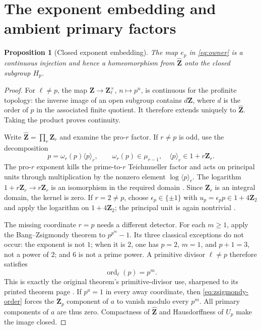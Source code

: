 \documentclass[11pt]{article}
\newtheorem{proposition}[theorem]{Proposition}
\theoremstyle{definition}
\DeclareMathOperator{\ord}{ord}
\begin{document}
\section{The exponent embedding and ambient primary factors}\label{sec:embedding}

\begin{proposition}[Closed exponent embedding]\label{prop:embedding}
The map $e_p$ in \eqref{eq:owner} is a continuous injection and hence a
homeomorphism from $\widehat{\mathbf Z}$ onto the closed subgroup $H_p$.
\end{proposition}

\begin{proof}
For $\ell\ne p$, the map $\mathbf Z\to\mathbf Z_\ell^\times$,
$n\mapsto p^n$, is continuous for the profinite topology: the inverse image
of an open subgroup contains $d\mathbf Z$, where $d$ is the order of $p$ in
the associated finite quotient.  It therefore extends uniquely to
$\widehat{\mathbf Z}$.  Taking the product proves continuity.

Write $\widehat{\mathbf Z}=\prod_r\mathbf Z_r$ and examine the pro-$r$
factor.  If $r\ne p$ is odd, use the decomposition
\[
p=\omega_r(p)\langle p\rangle_r,
\qquad
\omega_r(p)\in\mu_{r-1},
\quad \langle p\rangle_r\in1+r\mathbf Z_r.
\]
The pro-$r$ exponent kills the prime-to-$r$ Teichmueller factor and acts on
principal units through multiplication by the nonzero element
$\log\langle p\rangle_r$.  The logarithm
$1+r\mathbf Z_r\to r\mathbf Z_r$ is an isomorphism in the required domain
\citep[Example~8.15]{ConradInfiniteSeries}.  Since $\mathbf Z_r$ is an
integral domain, the kernel is zero.  If $r=2\ne p$, choose
$\epsilon_p\in\{\pm1\}$ with $u_p=\epsilon_pp\in1+4\mathbf Z_2$ and apply
the logarithm on $1+4\mathbf Z_2$; the principal unit is again nontrivial
\citep[Theorem~2.6 and Remark~2.8]{ConradPadicInterpolation}.

The missing coordinate $r=p$ needs a different detector.  For each $m\ge1$,
apply the Bang--Zsigmondy theorem to $p^{p^m}-1$.  Its three classical
exceptions do not occur: the exponent is not $1$; when it is $2$, one has
$p=2$, $m=1$, and $p+1=3$, not a power of $2$; and $6$ is not a prime
power.  A primitive divisor $\ell\ne p$ therefore satisfies
\begin{equation}\label{eq:zsigmondy-order}
\ord_\ell(p)=p^m.
\end{equation}
This is exactly the original theorem's primitive-divisor use, sharpened to
its printed theorem page
\citep[p.~283]{Zsigmondy1892}.  If $p^a=1$ in every away coordinate, then
\eqref{eq:zsigmondy-order} forces the $\mathbf Z_p$ component of $a$ to
vanish modulo every $p^m$.  All primary components of $a$ are thus zero.
Compactness of $\widehat{\mathbf Z}$ and Hausdorffness of $U_p$ make the
image closed.
\end{proof}
\end{document}
